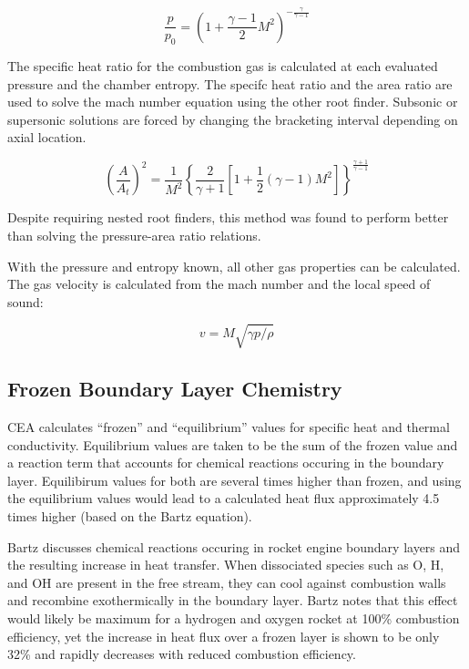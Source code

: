 \documentclass[11pt]{article}
\begin{document}
\begin{equation}
  \frac{p}{p_0} = (1 + \frac{\gamma - 1}{2} M^2) ^ {- \frac{\gamma}{\gamma - 1}}
\end{equation}

The specific heat ratio for the combustion gas is calculated at each evaluated pressure and the chamber entropy. The specifc heat ratio and the area ratio are used to solve the mach number equation using the other root finder. Subsonic or supersonic solutions are forced by changing the bracketing interval depending on axial location.

\begin{equation}
    \left( \frac{A}{A_t}\right)^2 = \frac{1}{M^2} \left\{ \frac{2}{\gamma + 1} \left[ 1 + \frac{1}{2} (\gamma - 1) M^2 \right] \right\}^{\frac{\gamma + 1}{\gamma - 1}}
\end{equation}

Despite requiring nested root finders, this method was found to perform better than solving the pressure-area ratio relations.

With the pressure and entropy known, all other gas properties can be calculated. The gas velocity is calculated from the mach number and the local speed of sound:

\begin{equation}
  v = M \sqrt{\gamma p / \rho}
\end{equation}

\subsection{Frozen Boundary Layer Chemistry}

CEA calculates ``frozen'' and ``equilibrium'' values for specific heat and thermal conductivity. Equilibrium values are taken to be the sum of the frozen value and a reaction term that accounts for chemical reactions occuring in the boundary layer. Equilibirum values for both are several times higher than frozen, and using the equilibrium values would lead to a calculated heat flux approximately 4.5 times higher (based on the Bartz equation).

Bartz \cite{page 46} discusses chemical reactions occuring in rocket engine boundary layers and the resulting increase in heat transfer. When dissociated species such as O, H, and OH are present in the free stream, they can cool against combustion walls and recombine exothermically in the boundary layer. Bartz notes that this effect would likely be maximum for a hydrogen and oxygen rocket at 100\% combustion efficiency, yet the increase in heat flux over a frozen layer is shown to be only 32\% and rapidly decreases with reduced combustion efficiency.
\end{document}
